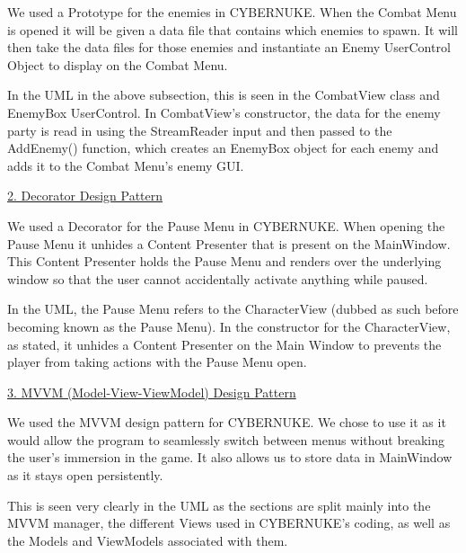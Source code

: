\documentclass[10pt,conference,onecolumn,compsoc]{IEEEtran}
\begin{document}
We used a Prototype for the enemies in CYBERNUKE. When the Combat Menu is opened it will be given a data file that contains which enemies to spawn. It will then take the data files for those enemies and instantiate an Enemy UserControl Object to display on the Combat Menu.

In the UML in the above subsection, this is seen in the CombatView class and EnemyBox UserControl. In CombatView's constructor, the data for the enemy party is read in using the StreamReader input and then passed to the AddEnemy() function, which creates an EnemyBox object for each enemy and adds it to the Combat Menu's enemy GUI.

\underline{2. Decorator Design Pattern}
\vspace{5px}

We used a Decorator for the Pause Menu in CYBERNUKE. When opening the Pause Menu it unhides a Content Presenter that is present on the MainWindow. This Content Presenter holds the Pause Menu and renders over the underlying window so that the user cannot accidentally activate anything while paused.

In the UML, the Pause Menu refers to the CharacterView (dubbed as such before becoming known as the Pause Menu). In the constructor for the CharacterView, as stated, it unhides a Content Presenter on the Main Window to prevents the player from taking actions with the Pause Menu open.

\underline{3. MVVM (Model-View-ViewModel) Design Pattern}
\vspace{5px}

We used the MVVM design pattern for CYBERNUKE. We chose to use it as it would allow the program to seamlessly switch between menus without breaking the user's immersion in the game. It also allows us to store data in MainWindow as it stays open persistently.

This is seen very clearly in the UML as the sections are split mainly into the MVVM manager, the different Views used in CYBERNUKE's coding, as well as the Models and ViewModels associated with them.


\end{document}

